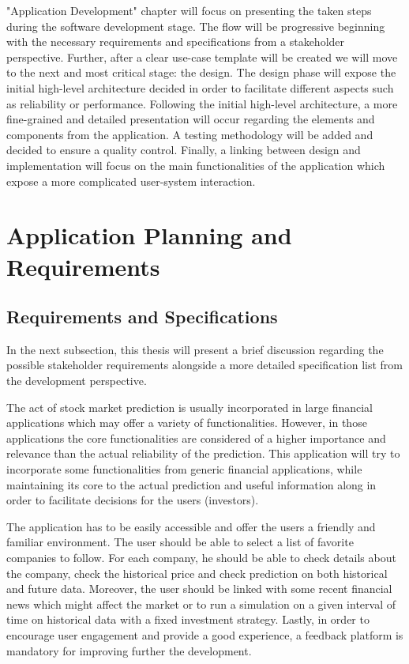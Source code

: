 "Application Development" chapter will focus on presenting the taken steps during the software development stage. The flow will be progressive beginning with the necessary requirements and specifications from a stakeholder perspective. Further, after a clear use-case template will be created we will move to the next and most critical stage: the design. The design phase will expose the initial high-level architecture decided in order to facilitate different aspects such as reliability or performance. Following the initial high-level architecture, a more fine-grained and detailed presentation will occur regarding the elements and components from the application. A testing methodology will be added and decided to ensure a quality control. Finally, a linking between design and implementation will focus on the main functionalities of the application which expose a more complicated user-system interaction.



\section{Application Planning and Requirements}
\subsection{Requirements and Specifications}
In the next subsection, this thesis will present a brief discussion regarding the possible stakeholder requirements alongside a more detailed specification list from the development perspective.

The act of stock market prediction is usually incorporated in large financial applications which may offer a variety of functionalities. However, in those applications the core functionalities are considered of a higher importance and relevance than the actual reliability of the prediction. This application will try to incorporate some functionalities from generic financial applications, while maintaining its core to the actual prediction and useful information along in order to facilitate decisions for the users (investors).

The application has to be easily accessible and offer the users a friendly and familiar environment. The user should be able to select a list of favorite companies to follow. For each company, he should be able to check details about the company, check the historical price and check prediction on both historical and future data. Moreover, the user should be linked with some recent financial news which might affect the market or to run a simulation on a given interval of time on historical data with a fixed investment strategy. Lastly, in order to encourage user engagement and provide a good experience, a feedback platform is mandatory for improving further the development. 

